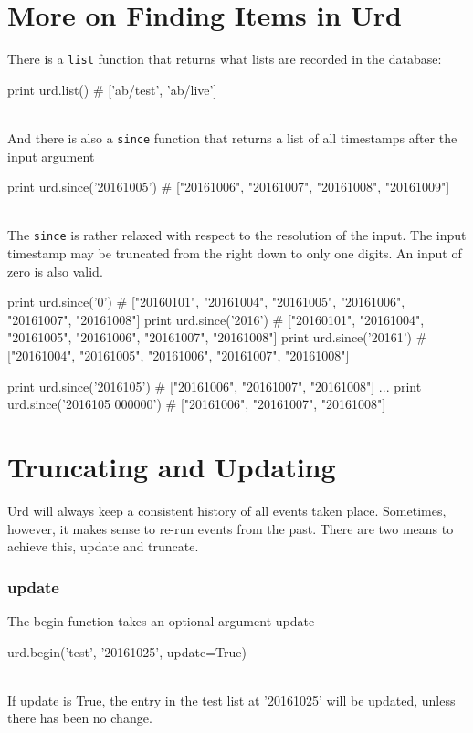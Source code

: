 \section{More on Finding Items in Urd}
There is a \texttt{list} function that returns what lists are recorded
in the database:
\\
\begin{pythonBEG}
  print urd.list()
  # ['ab/test', 'ab/live']
\end{pythonBEG}
\\
And there is also a \texttt{since} function that returns a list of all
timestamps after the input argument
\\
\begin{pythonMID}
  print urd.since('20161005')
  # ["20161006", "20161007", "20161008", "20161009"]
\end{pythonMID}
\\
The \texttt{since} is rather relaxed with respect to the resolution of
the input.  The input timestamp may be truncated from the right down
to only one digits.  An input of zero is also valid.
\\
\begin{pythonEND}
  print urd.since('0')
  # ["20160101", "20161004", "20161005", "20161006", "20161007", "20161008"]
  print urd.since('2016')
  # ["20160101", "20161004", "20161005", "20161006", "20161007", "20161008"]
  print urd.since('20161')
  # ["20161004", "20161005", "20161006", "20161007", "20161008"]

  print urd.since('2016105')
  # ["20161006", "20161007", "20161008"]
  ...
  print urd.since('2016105 000000')
  # ["20161006", "20161007", "20161008"]
\end{pythonEND}



\section{Truncating and Updating}

Urd will always keep a consistent history of all events taken place.
Sometimes, however, it makes sense to re-run events from the past.
There are two means to achieve this, update and truncate.

\subsubsection{update}
The begin-function takes an optional argument update

\begin{python}
  urd.begin('test', '20161025', update=True)
\end{python}
\\
If update is True, the entry in the test list at '20161025' will be
updated, unless there has been no change.

